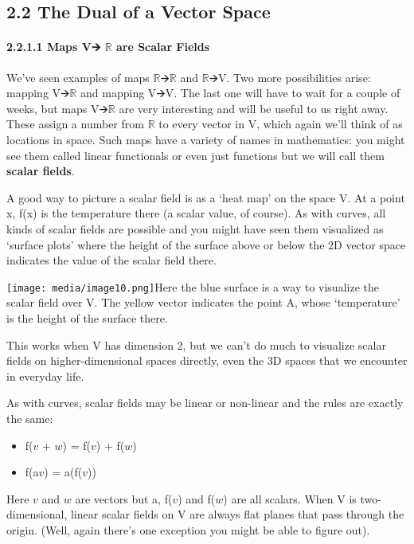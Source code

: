 \documentclass[oneside,english]{amsbook}
\numberwithin{section}{chapter}
\theoremstyle{plain}
\theoremstyle{definition}
\begin{document}
\subsection{2.2 The Dual of a Vector
	Space}\label{the-dual-of-a-vector-space}

\paragraph{\texorpdfstring{2.2.1.1 Maps V🡪 $\mathbb{R}$ are Scalar
		Fields}{2.2.1.1 Maps V🡪 R are Scalar Fields}}\label{maps-v-r-are-scalar-fields}

We've seen examples of maps $\mathbb{R}$🡪$\mathbb{R}$ and $\mathbb{R}$🡪V. Two
more possibilities arise: mapping V🡪$\mathbb{R}$ and mapping V🡪V. The last
one will have to wait for a couple of weeks, but maps V🡪$\mathbb{R}$ are
very interesting and will be useful to us right away. These assign a
number from $\mathbb{R}$ to every vector in V, which again we'll think of
as locations in space. Such maps have a variety of names in mathematics:
you might see them called linear functionals or even just functions but
we will call them \textbf{scalar fields}.

A good way to picture a scalar field is as a `heat map' on the space
V. At a point x, f(x) is the temperature there (a scalar value, of
course). As with curves, all kinds of scalar fields are possible and you
might have seen them visualized as `surface plots' where the height of
the surface above or below the 2D vector space indicates the value of
the scalar field there.

\texttt{[image: media/image10.png]}Here
the blue surface is a way to visualize the scalar field over V. The
yellow vector indicates the point A, whose `temperature' is the height
of the surface there.

This works when V has dimension 2, but we can't do much to visualize
scalar fields on higher-dimensional spaces directly, even the 3D spaces
that we encounter in everyday life.

As with curves, scalar fields may be linear or non-linear and the rules
are exactly the same:

\begin{itemize}
	\item
	f($v$ + $w$) = f($v$) + f($w$)
	\item
	f(a$v$) = a(f($v$))
\end{itemize}

Here $v$ and $w$ are vectors but a, f($v$) and f($w$) are
all scalars. When V is two-dimensional, linear scalar fields on V are
always flat planes that pass through the origin. (Well, again there's
one exception you might be able to figure out).
\end{document}
